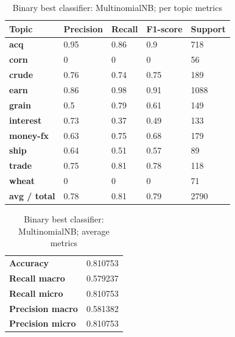 \documentclass{article}
\begin{document}
\begin{table}[H]
\begin{tabular}{l|llll}
\textbf{Topic}       & \textbf{Precision} & \textbf{Recall} & \textbf{F1-score} & \textbf{Support} \\ \hline
\textbf{acq}         & 0.95               & 0.86            & 0.9               & 718              \\
\textbf{corn}        & 0                  & 0               & 0                 & 56               \\
\textbf{crude}       & 0.76               & 0.74            & 0.75              & 189              \\
\textbf{earn}        & 0.86               & 0.98            & 0.91              & 1088             \\
\textbf{grain}       & 0.5                & 0.79            & 0.61              & 149              \\
\textbf{interest}    & 0.73               & 0.37            & 0.49              & 133              \\
\textbf{money-fx}    & 0.63               & 0.75            & 0.68              & 179              \\
\textbf{ship}        & 0.64               & 0.51            & 0.57              & 89               \\
\textbf{trade}       & 0.75               & 0.81            & 0.78              & 118              \\
\textbf{wheat}       & 0                  & 0               & 0                 & 71               \\ \hline
\textbf{avg / total} & 0.78               & 0.81            & 0.79              & 2790            
\end{tabular}
\caption {Binary best classifier: MultinomialNB; per topic metrics}
\end{table}

\begin{table}[H]
\begin{tabular}{l|l}
\textbf{Accuracy}        & 0.810753 \\
\textbf{Recall macro}    & 0.579237 \\
\textbf{Recall micro}    & 0.810753 \\
\textbf{Precision macro} & 0.581382 \\
\textbf{Precision micro} & 0.810753
\end{tabular}
\caption {Binary best classifier: MultinomialNB; average metrics}
\end{table}
\end{document}
